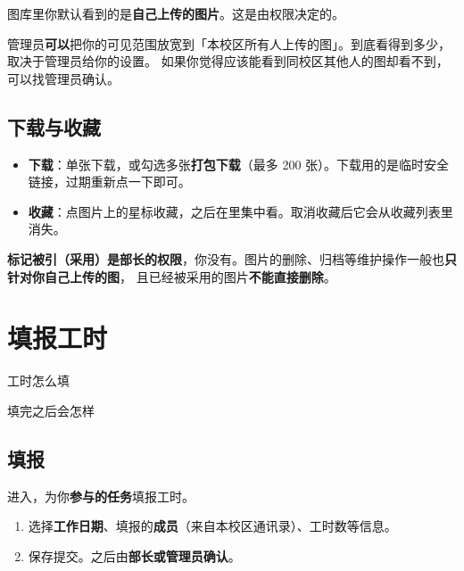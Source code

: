 \documentclass[cn,11pt,green]{elegantbook}
\begin{document}
图库里你默认看到的是\textbf{自己上传的图片}。这是由权限决定的。

\begin{notebox}[看到的范围可能被放宽]
  管理员\textbf{可以}把你的可见范围放宽到「本校区所有人上传的图」。到底看得到多少，取决于管理员给你的设置。
  如果你觉得应该能看到同校区其他人的图却看不到，可以找管理员确认。
\end{notebox}

\section{下载与收藏}

\begin{itemize}
  \item \textbf{下载}：单张下载，或勾选多张\textbf{打包下载}（最多 200 张）。下载用的是临时安全链接，过期重新点一下即可。
  \item \textbf{收藏}：点图片上的星标收藏，之后在里集中看。取消收藏后它会从收藏列表里消失。
\end{itemize}

\begin{warnbox}[采用、删除不归你管]
  \textbf{标记被引（采用）是部长的权限}，你没有。图片的删除、归档等维护操作一般也\textbf{只针对你自己上传的图}，
  且已经被采用的图片\textbf{不能直接删除}。
\end{warnbox}

\chapter{填报工时}

\begin{introduction}
  \item 工时怎么填
  \item 填完之后会怎样
\end{introduction}

\section{填报}

进入，为你\textbf{参与的任务}填报工时。

\begin{stepbox}[填一条工时]
  \begin{enumerate}
    \item 选择\textbf{工作日期}、填报的\textbf{成员}（来自本校区通讯录）、工时数等信息。
    \item 保存提交。之后由\textbf{部长或管理员确认}。
  \end{enumerate}
\end{stepbox}
\end{document}
